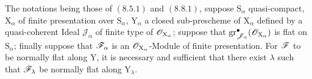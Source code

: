 \begin{proposition}[11.3.6]
\label{IV.11.3.6}
The notations being those of $(8.5.1)$ and $(8.8.1)$, suppose $\mathrm{S}_\alpha$ quasi-compact, $\mathrm{X}_\alpha$ of finite presentation over $\mathrm{S}_\alpha$, $\mathrm{Y}_\alpha$ a closed sub-prescheme of $\mathrm{X}_\alpha$ defined by a quasi-coherent Ideal $\mathscr{J}_\alpha$ of finite type of $\mathscr{O}_{\mathrm{X}_\alpha}$; suppose that $\operatorname{gr}^\bullet_{\mathscr{J}_\alpha}(\mathscr{O}_{\mathrm{X}_\alpha})$ is flat on $\mathrm{S}_\alpha$; finally suppose that $\mathscr{F}_\alpha$ is an $\mathscr{O}_{\mathrm{X}_\alpha}$-Module of finite presentation. For $\mathscr{F}$ to be normally flat along $\mathrm{Y}$, it is necessary and sufficient that there exist $\lambda$ such that $\mathscr{F}_\lambda$ be normally flat along $\mathrm{Y}_\lambda$.
\end{proposition}

